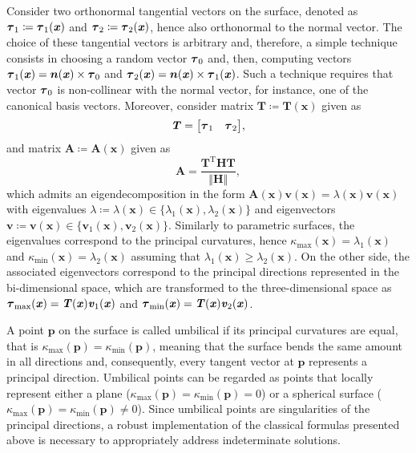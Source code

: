 Consider two orthonormal tangential vectors on the surface, denoted as $\bs{\tau}_{1}\coloneqq\bs{\tau}_{1}\left(\bm{x}\right)$ and $\bs{\tau}_{2}\coloneqq\bs{\tau}_{2}\left(\bm{x}\right)$, hence also orthonormal to the normal vector.
The choice of these tangential vectors is arbitrary and, therefore, a simple technique consists in choosing a random vector $\boldsymbol{\tau}_{0}$ and, then, computing vectors $\bs{\tau}_{1}\left(\bm{x}\right)=\bs{n}\left(\bm{x}\right)\times\bs{\tau}_{0}$ and $\bs{\tau}_{2}\left(\bm{x}\right)=\bs{n}\left(\bm{x}\right)\times\bs{\tau}_{1}\left(\bm{x}\right)$.
Such a technique requires that vector $\boldsymbol{\tau}_{0}$ is non-collinear with the normal vector, for instance, one of the canonical basis vectors.
Moreover, consider matrix $\bm{T}\coloneqq\bm{T}\left(\bm{x}\right)$ given as
\begin{equation}
\bm{T}=\begin{bmatrix}
\bs{\tau}_{1} & \bs{\tau}_{2}
\end{bmatrix},
\end{equation}
and matrix $\bm{A}\coloneqq\bm{A}\left(\bm{x}\right)$ given as
\begin{equation}
\bm{A}=\frac{\bm{T}^{\textrm{T}}\bm{H}\bm{T}}{\left\Vert\bm{H}\right\Vert},
\end{equation}
which admits an eigendecomposition in the form $\bm{A}\left(\bm{x}\right)\bm{v}\left(\bm{x}\right)=\lambda\left(\bm{x}\right)\bm{v}\left(\bm{x}\right)$ with eigenvalues $\lambda\coloneqq\lambda\left(\bm{x}\right)\in\lbrace\lambda_{1}\left(\bm{x}\right),\lambda_{2}\left(\bm{x}\right)\rbrace$ and eigenvectors $\bm{v}\coloneqq\bm{v}\left(\bm{x}\right)\in\lbrace\bm{v}_{1}\left(\bm{x}\right),\bm{v}_{2}\left(\bm{x}\right)\rbrace$.
Similarly to parametric surfaces, the eigenvalues correspond to the principal curvatures, hence $\kappa_{\textrm{max}}\left(\bm{x}\right)=\lambda_{1}\left(\bm{x}\right)$ and $\kappa_{\textrm{min}}\left(\bm{x}\right)=\lambda_{2}\left(\bm{x}\right)$ assuming that $\lambda_{1}\left(\bm{x}\right)\geq\lambda_{2}\left(\bm{x}\right)$.
On the other side, the associated eigenvectors correspond to the principal directions represented in the bi-dimensional space, which are transformed to the three-dimensional space as $\bs{\tau}_{\textrm{max}}\left(\bm{x}\right)=\bm{T}\left(\bm{x}\right)\bm{v}_{1}\left(\bm{x}\right)$ and $\bs{\tau}_{\textrm{min}}\left(\bm{x}\right)=\bm{T}\left(\bm{x}\right)\bm{v}_{2}\left(\bm{x}\right)$.

A point $\bm{p}$ on the surface is called umbilical if its principal curvatures are equal, that is $\kappa_{\textrm{max}}\left(\bm{p}\right)=\kappa_{\textrm{min}}\left(\bm{p}\right)$, meaning that the surface bends the same amount in all directions and, consequently, every tangent vector at $\bm{p}$ represents a principal direction.
Umbilical points can be regarded as points that locally represent either a plane ($\kappa_{\textrm{max}}\left(\bm{p}\right)=\kappa_{\textrm{min}}\left(\bm{p}\right)=0$) or a spherical surface ($\kappa_{\textrm{max}}\left(\bm{p}\right)=\kappa_{\textrm{min}}\left(\bm{p}\right)\neq 0$).
Since umbilical points are singularities of the principal directions, a robust implementation of the classical formulas presented above is necessary to appropriately address indeterminate solutions.

